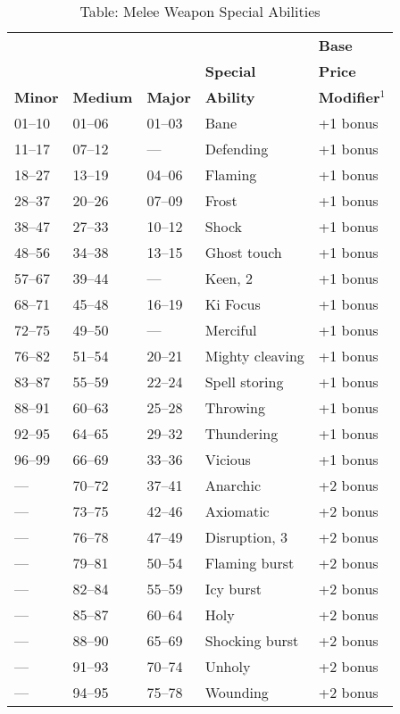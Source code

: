 \begin{table}[]
\sffamily
\caption{Table: Melee Weapon Special Abilities}
\setlength{\tabcolsep}{1pt}
\begin{tabularx}{\linewidth}{lllXl}
               &                 &                &                  & \textbf{Base} \\
               &                 &                & \textbf{Special} & \textbf{Price} \\
\textbf{Minor} & \textbf{Medium} & \textbf{Major} & \textbf{Ability} & \textbf{Modifier\(^{1}\)}\\
01--10 & 01--06 & 01--03 & Bane & +1 bonus\\
11--17 & 07--12 & --- & Defending & +1 bonus\\
18--27 & 13--19 & 04--06 & Flaming & +1 bonus\\
28--37 & 20--26 & 07--09 & Frost & +1 bonus\\
38--47 & 27--33 & 10--12 & Shock & +1 bonus\\
48--56 & 34--38 & 13--15 & Ghost touch & +1 bonus\\
57--67 & 39--44 & --- & Keen, 2 & +1 bonus\\
68--71 & 45--48 & 16--19 & Ki Focus & +1 bonus\\
72--75 & 49--50 & --- & Merciful & +1 bonus\\
76--82 & 51--54 & 20--21 & Mighty cleaving & +1 bonus\\
83--87 & 55--59 & 22--24 & Spell storing & +1 bonus\\
88--91 & 60--63 & 25--28 & Throwing & +1 bonus\\
92--95 & 64--65 & 29--32 & Thundering & +1 bonus\\
96--99 & 66--69 & 33--36 & Vicious & +1 bonus\\
--- & 70--72 & 37--41 & Anarchic & +2 bonus\\
--- & 73--75 & 42--46 & Axiomatic & +2 bonus\\
--- & 76--78 & 47--49 & Disruption, 3 & +2 bonus\\
--- & 79--81 & 50--54 & Flaming burst & +2 bonus\\
--- & 82--84 & 55--59 & Icy burst & +2 bonus\\
--- & 85--87 & 60--64 & Holy & +2 bonus\\
--- & 88--90 & 65--69 & Shocking burst & +2 bonus\\
--- & 91--93 & 70--74 & Unholy & +2 bonus\\
--- & 94--95 & 75--78 & Wounding & +2 bonus\\

\end{tabularx}
\end{table}
